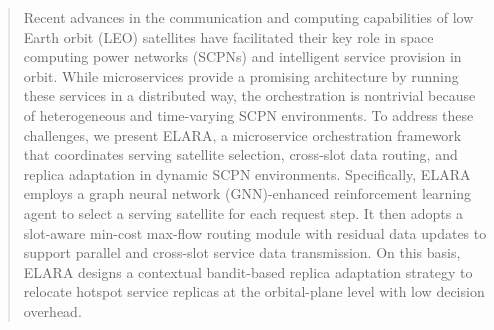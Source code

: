 \documentclass[10pt, conference, letterpaper]{IEEEtran}
\begin{document}
\begin{abstract}

Recent advances in the communication and computing capabilities of low Earth orbit (LEO) satellites have facilitated their key role in space computing power networks (SCPNs) and intelligent service provision in orbit. 
While microservices provide a promising architecture by running these services in a distributed way, the orchestration is nontrivial because of heterogeneous and time-varying SCPN environments.
To address these challenges, we present ELARA, a microservice orchestration framework that coordinates serving satellite selection, cross-slot data routing, and replica adaptation in dynamic SCPN environments. Specifically, ELARA employs a graph neural network (GNN)-enhanced reinforcement learning agent to select a serving satellite for each request step. It then adopts a slot-aware min-cost max-flow routing module with residual data updates to support parallel and cross-slot service data transmission. On this basis, ELARA designs a contextual bandit-based replica adaptation strategy to relocate hotspot service replicas at the orbital-plane level with low decision overhead. 

\end{abstract}
\end{document}
